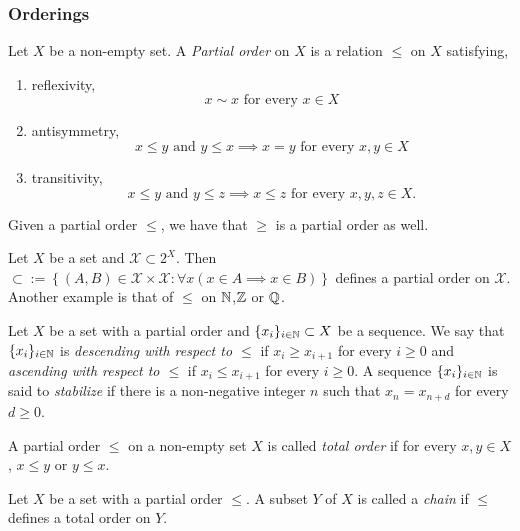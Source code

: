 \subsubsection{Orderings}
\begin{definition}
    Let $X$ be a non-empty set. A \textit{Partial order} on $X$ is a relation $\leq$ on $X$ satisfying,
    \begin{enumerate}
        \item reflexivity,
        $$x\sim x \text{ for every } x \in X$$
        \item antisymmetry, 
        $$x\leq y \text{ and } y\leq x \implies x = y \text{ for every } x,y\in X$$
        \item transitivity, 
        $$x \leq y \text{ and } y \leq z \implies x \leq z \text{ for every } x,y,z\in X.$$
    \end{enumerate}
\end{definition}
\begin{remark}
    Given a partial order $\leq$, we have that $\geq$ is a partial order as well.
\end{remark}
\begin{example}
    Let $X$ be a set and $\mathcal{X}\subset 2^X$. Then $\subset := \left\{(A,B)\in \mathcal{X}\times \mathcal{X} : \forall x(x\in A \implies x\in B) \right\}$ defines a partial order on $\mathcal{X}$.\\
    Another example is that of $\leq$ on $\mathbb{N}$,$\mathbb{Z}$ or $\mathbb{Q}$. 
\end{example}
\begin{definition}
    Let $X$ be a set with a partial order and $\{x_i\}_{i\in \mathbb{N}} \subset X$ be a sequence. We say that $\{x_i\}_{i\in\mathbb{N}}$ is \textit{descending with respect to $\leq$} if $x_i \geq x_{i+1}$ for every $i\geq 0$ and \textit{ascending with respect to $\leq$} if $x_i \leq x_{i+1}$ for every $i\geq 0$. A sequence $\{x_i\}_{i\in \mathbb{N}}$ is said to \textit{stabilize} if there is a non-negative integer $n$ such that $x_n = x_{n+d}$ for every $d\geq 0$. 
\end{definition}
\begin{definition}
    A partial order $\leq$ on a non-empty set $X$ is called \textit{total order} if for every $x,y\in X$, $x\leq y$ or $y\leq x$. 
\end{definition}
\begin{definition}
    Let $X$ be a set with a partial order $\leq$. A subset $Y$ of $X$ is called a \textit{chain} if $\leq$ defines a total order on $Y$.  
\end{definition}
